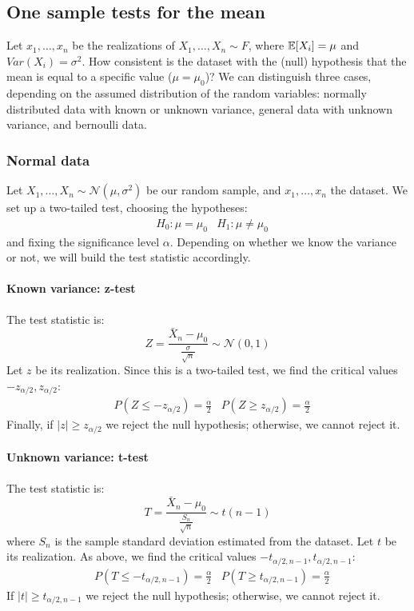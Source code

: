 \subsection{One sample tests for the mean}

Let $x_1, \ldots, x_n$ be the realizations of $X_1, \ldots, X_n \sim F$, where $\mathbb{E}[X_i] = \mu$ and $Var(X_i)=\sigma^2$. How consistent is the dataset with the (null) hypothesis that the mean is equal to a specific value ($\mu = \mu_0$)? We can distinguish three cases, depending on the assumed distribution of the random variables: normally distributed data with known or unknown variance, general data with unknown variance, and bernoulli data.

\subsubsection{Normal data}

Let $X_1, \ldots, X_n \sim \mathcal{N}(\mu, \sigma^2)$ be our random sample, and $x_1, \ldots, x_n$ the dataset. We set up a two-tailed test, choosing the hypotheses:
\begin{align*}
    &H_0 : \mu = \mu_0 &H_1 : \mu \not = \mu_0
\end{align*}
and fixing the significance level $\alpha$. Depending on whether we know the variance or not, we will build the test statistic accordingly.

\paragraph{Known variance: z-test}
The test statistic is:
\begin{equation*}
    Z = \frac{\bar{X}_n - \mu_0}{\frac{\sigma}{\sqrt{n}}} \sim \mathcal{N}(0,1)
\end{equation*}
Let $z$ be its realization. Since this is a two-tailed test, we find the critical values $-z_{\alpha/2}, z_{\alpha/2}$:
\begin{align*}
    &P(Z \leq -z_{\alpha/2}) = \frac{\alpha}{2} &P(Z \geq z_{\alpha/2}) = \frac{\alpha}{2}
\end{align*}
Finally, if $|z| \geq z_{\alpha/2}$ we reject the null hypothesis; otherwise, we cannot reject it.

\paragraph{Unknown variance: t-test}
The test statistic is:
\begin{equation*}
    T = \frac{\bar{X}_n - \mu_0}{\frac{S_n}{\sqrt{n}}} \sim t(n-1)
\end{equation*}
where $S_n$ is the sample standard deviation estimated from the dataset. Let $t$ be its realization. As above, we find the critical values $-t_{\alpha/2, n-1}, t_{\alpha/2, n-1}$:
\begin{align*}
    &P(T \leq -t_{\alpha/2, n-1}) = \frac{\alpha}{2} &P(T \geq t_{\alpha/2, n-1}) = \frac{\alpha}{2}
\end{align*}
If $|t| \geq t_{\alpha/2, n-1}$ we reject the null hypothesis; otherwise, we cannot reject it.

